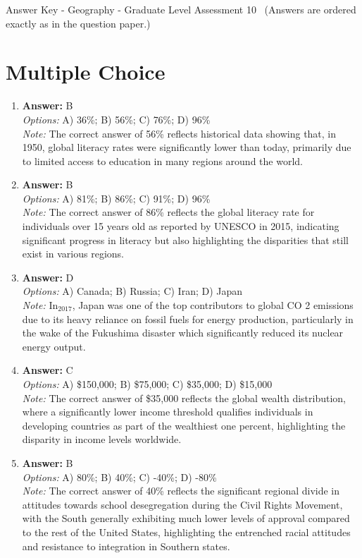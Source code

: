 \documentclass[12pt]{article}
\begin{document}
\begin{center}
Answer Key - Geography - Graduate Level Assessment 10 \
\small (Answers are ordered exactly as in the question paper.)
\end{center}

\section*{Multiple Choice}
\begin{enumerate}[label=\arabic*.]
\item \textbf{Answer:} B
\\ \textit{Options:} A) 36\%; B) 56\%; C) 76\%; D) 96\%
\\ \textit{Note:} The correct answer of 56\% reflects historical data showing that, in 1950, global literacy rates were significantly lower than today, primarily due to limited access to education in many regions around the world.
\item \textbf{Answer:} B
\\ \textit{Options:} A) 81\%; B) 86\%; C) 91\%; D) 96\%
\\ \textit{Note:} The correct answer of 86\% reflects the global literacy rate for individuals over 15 years old as reported by UNESCO in 2015, indicating significant progress in literacy but also highlighting the disparities that still exist in various regions.
\item \textbf{Answer:} D
\\ \textit{Options:} A) Canada; B) Russia; C) Iran; D) Japan
\\ \textit{Note:} In$_{2017}$, Japan was one of the top contributors to global CO 2 emissions due to its heavy reliance on fossil fuels for energy production, particularly in the wake of the Fukushima disaster which significantly reduced its nuclear energy output.
\item \textbf{Answer:} C
\\ \textit{Options:} A) \$150,000; B) \$75,000; C) \$35,000; D) \$15,000
\\ \textit{Note:} The correct answer of \$35,000 reflects the global wealth distribution, where a significantly lower income threshold qualifies individuals in developing countries as part of the wealthiest one percent, highlighting the disparity in income levels worldwide.
\item \textbf{Answer:} B
\\ \textit{Options:} A) 80\%; B) 40\%; C) -40\%; D) -80\%
\\ \textit{Note:} The correct answer of 40\% reflects the significant regional divide in attitudes towards school desegregation during the Civil Rights Movement, with the South generally exhibiting much lower levels of approval compared to the rest of the United States, highlighting the entrenched racial attitudes and resistance to integration in Southern states.
\end{enumerate}
\end{document}
